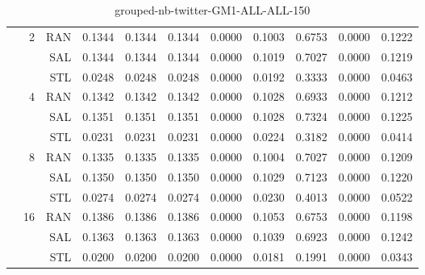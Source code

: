 \begin{center}
\begin{table}[htbp]
\begin{tabular}{ | r | r | r | r | r | r | r | r | r | r | r |}
 & \multirow{3}{*}{2} & RAN & 0.1344 & 0.1344 & 0.1344 & 0.0000 & 0.1003 & 0.6753 & 0.0000 & 0.1222\\ \cline{3-11}
 &   & SAL & 0.1344 & 0.1344 & 0.1344 & 0.0000 & 0.1019 & 0.7027 & 0.0000 & 0.1219\\ \cline{3-11}
 &   & STL & 0.0248 & 0.0248 & 0.0248 & 0.0000 & 0.0192 & 0.3333 & 0.0000 & 0.0463\\ \cline{2-11}
 & \multirow{3}{*}{4} & RAN & 0.1342 & 0.1342 & 0.1342 & 0.0000 & 0.1028 & 0.6933 & 0.0000 & 0.1212\\ \cline{3-11}
 &   & SAL & 0.1351 & 0.1351 & 0.1351 & 0.0000 & 0.1028 & 0.7324 & 0.0000 & 0.1225\\ \cline{3-11}
 &   & STL & 0.0231 & 0.0231 & 0.0231 & 0.0000 & 0.0224 & 0.3182 & 0.0000 & 0.0414\\ \cline{2-11}
 & \multirow{3}{*}{8} & RAN & 0.1335 & 0.1335 & 0.1335 & 0.0000 & 0.1004 & 0.7027 & 0.0000 & 0.1209\\ \cline{3-11}
 &   & SAL & 0.1350 & 0.1350 & 0.1350 & 0.0000 & 0.1029 & 0.7123 & 0.0000 & 0.1220\\ \cline{3-11}
 &   & STL & 0.0274 & 0.0274 & 0.0274 & 0.0000 & 0.0230 & 0.4013 & 0.0000 & 0.0522\\ \cline{2-11}
 & \multirow{3}{*}{16} & RAN & 0.1386 & 0.1386 & 0.1386 & 0.0000 & 0.1053 & 0.6753 & 0.0000 & 0.1198\\ \cline{3-11}
 &   & SAL & 0.1363 & 0.1363 & 0.1363 & 0.0000 & 0.1039 & 0.6923 & 0.0000 & 0.1242\\ \cline{3-11}
 &   & STL & 0.0200 & 0.0200 & 0.0200 & 0.0000 & 0.0181 & 0.1991 & 0.0000 & 0.0343\\ \cline{2-11}
\hline
\end{tabular}
\caption{grouped-nb-twitter-GM1-ALL-ALL-150}
\end{table}
\end{center}

